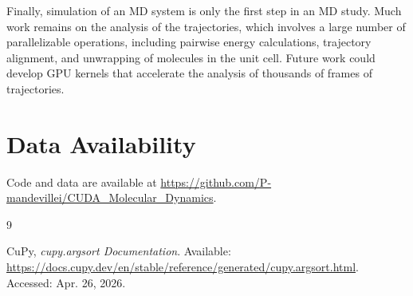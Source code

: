 \documentclass[12pt]{article}
\begin{document}
Finally, simulation of an MD system is only the first step in an MD study. Much work remains on the analysis of the trajectories, which involves a large number of parallelizable operations, including pairwise energy calculations, trajectory alignment, and unwrapping of molecules in the unit cell. Future work could develop GPU kernels that accelerate the analysis of thousands of frames of trajectories.

\section{Data Availability}

Code and data are available at \url{https://github.com/P-mandevillei/CUDA_Molecular_Dynamics}.

\begin{thebibliography}{9}

CuPy,
\textit{cupy.argsort Documentation}.
Available: \url{https://docs.cupy.dev/en/stable/reference/generated/cupy.argsort.html}.
Accessed: Apr. 26, 2026.

\end{thebibliography}
\end{document}
